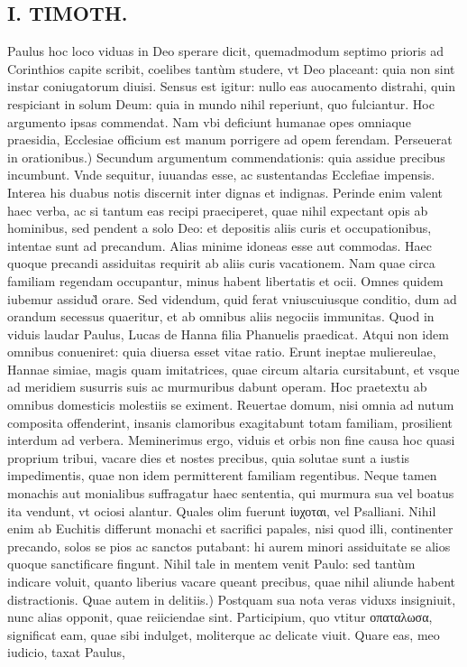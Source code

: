 \documentclass{article}
\begin{document}
\begin{pages}
\section*{I. TIMOTH. }
\marginpar{[ p.58 ]}\pstart Paulus hoc loco viduas in Deo sperare dicit, quemadmodum septimo prioris ad Corinthios capite scribit, coelibes tantùm studere, vt Deo placeant: quia non sint instar coniugatorum diuisi. Sensus est igitur: nullo eas auocamento distrahi, quin respiciant in solum Deum: quia in mundo nihil reperiunt, quo fulciantur. Hoc argumento ipsas commendat. Nam vbi deficiunt humanae opes omniaque praesidia, Ecclesiae officium est manum porrigere ad opem ferendam.  \pend\pstart Perseuerat in orationibus.) Secundum argumentum commendationis: quia assidue precibus incumbunt. Vnde sequitur, iuuandas esse, ac sustentandas Ecclefiae impensis. Interea his duabus notis discernit inter dignas et indignas. Perinde enim valent haec verba, ac si tantum eas recipi praeciperet, quae nihil expectant opis ab hominibus, sed pendent a solo Deo: et depositis aliis curis et occupationibus, intentae sunt ad precandum. Alias minime idoneas esse aut commodas. Haec quoque precandi assiduitas requirit ab aliis curis vacationem. Nam quae circa familiam regendam occupantur, minus habent libertatis et ocii. Omnes quidem iubemur assidud̀ orare. Sed videndum, quid ferat vniuscuiusque conditio, dum ad orandum secessus quaeritur, et ab omnibus aliis negociis immunitas. Quod in viduis laudar Paulus, Lucas de Hanna filia Phanuelis praedicat. Atqui non idem omnibus conueniret: quia diuersa esset vitae ratio. Erunt ineptae muliereulae, Hannae simiae, magis quam imitatrices, quae circum altaria cursitabunt, et vsque ad meridiem susurris suis ac murmuribus dabunt operam. Hoc praetextu ab omnibus domesticis molestiis se eximent. Reuertae domum, nisi omnia ad nutum composita offenderint, insanis clamoribus exagitabunt totam familiam, prosilient interdum ad verbera. Meminerimus ergo, viduis et orbis non fine causa hoc quasi proprium tribui, vacare dies et nostes precibus, quia solutae sunt a iustis impedimentis, quae non idem permitterent familiam regentibus. Neque tamen monachis aut monialibus suffragatur haec sententia, qui murmura sua vel boatus ita vendunt, vt ociosi alantur. Quales olim fuerunt ἰυχοται, vel Psalliani. Nihil enim ab Euchitis differunt monachi et sacrifici papales, nisi quod illi, continenter precando, solos se pios ac sanctos putabant: hi aurem minori assiduitate se alios quoque sanctificare fingunt. Nihil tale in mentem venit Paulo: sed tantùm indicare voluit, quanto liberius vacare queant precibus, quae nihil aliunde habent distractionis.  \pend\pstart Quae autem in delitiis.) Postquam sua nota veras viduxs insigniuit, nunc alias opponit, quae reiiciendae sint. Participium, quo vtitur οπαταλωσα, significat eam, quae sibi indulget, moliterque ac delicate viuit. Quare eas, meo iudicio, taxat Paulus,  \pend

\end{pages}
\end{document}
